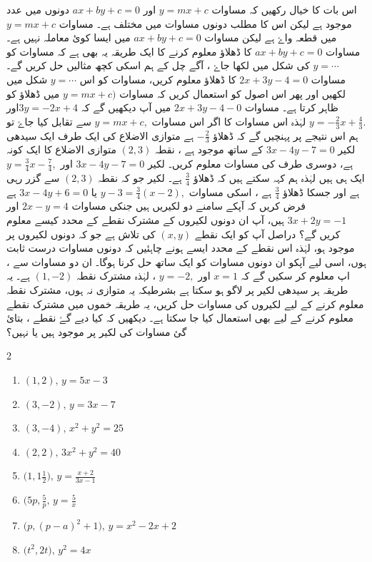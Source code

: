 اس بات کا خیال رکھیں کہ مساوات  \( y=mx+c \) اور \( ax+by+c=0 \) دونوں میں عدد   موجود ہے لیکن اس کا مطلب دونوں مساوات میں مختلف ہے۔ مساوات \( y=mx+c \) میں   قطعہ واۓ ہے لیکن مساوات \( ax+by+c=0 \) میں ایسا کوئ معاملہ نہیں ہے۔
مساوات \( ax+by+c=0 \) کا ڈھلاؤ معلوم کرنے کا ایک طریقہ یہ بھی ہے کہ مساوات کو  \( y= \cdots \) کی شکل میں لکھا جاۓ ، آگے چل کے ہم اسکی کچھ مثالیں حل کریں گے۔
مساوات \( 2x+3y-4=0 \) کا ڈھلاؤ معلوم کریں،
مساوات کو اس \( y= \cdots \) شکل میں لکھیں اور پھر اس اصول کو استعمال کریں کہ مساوات \( y=mx+c) \) میں  ڈھلاؤ کو ظاہر کرتا ہے۔ 
مساوات \(  2x+3y-4-0 \) میں آپ دیکھیں گے کہ \( 3y = -2x +4 \)اور\( y= - \frac{2}{3} x + \frac{4}{3}. \) لہٰذہ اس مساوات کا اگر  اس مساوات \( y=mx+c ,\) سے تقابل کیا جاۓ تو ہم اس نتیجے پر پہنچیں گے کہ ڈھلاؤ  \(- \frac{2}{3} \) ہے
متوازی الاضلاع کی ایک طرف ایک سیدھی لکیر \( 3x -4y -7 = 0 \) کے ساتھ موجود ہے ، نقطہ \( (2,3) \) متوازی الاضلاع کا ایک کونہ ہے، دوسری طرف کی مساوات معلوم کریں۔
لکیر \( 3x-4y-7=0 \) اور \( y= \frac{3}{4}x - \frac{7}{4} , \) ایک ہی ہیں لہٰذہ ہم کہہ سکتے ہیں کہ ڈھلاؤ \( \frac{3}{4}\) ہے۔ لکیر جو کہ نقطہ \( (2,3) \) سے گزر رہی ہے اور جسکا ڈھلاؤ \( \frac{3}{4}\) ہے ، اسکی مساوات \( y-3=\frac{3}{4} (x-2) , \) یا \( 3x-4y+6=0 \) ہے
فرض کریں کہ آپکے سامنے دو لکیریں ہیں جنکی مساوات \( 2x-y=4  \) اور \(  3x+2y=-1\) ہیں، آپ ان دونوں لکیروں کے مشترک نقطے کے محدد کیسے معلوم کریں گے؟
دراصل آپ کو ایک نقطے \(  (x,y)    \) کی تلاش ہے جو کہ دونوں لکیروں پر موجود ہو، لہٰذہ اس نقطے کے محدد ایسے ہونے چاہئیں کہ دونوں مساوات درست  ثابت ہوں، اسی لیے آپکو ان دونوں مساوات کو ایک ساتھ حل کرنا ہوگا۔
ان دو مساوات سے ، اپ معلوم کر سکیں گے کہ \( x=1\) اور \( y=-2, \) ، لہٰذہ مشترک نقطہ \( (1,-2) \) ہے۔ 
یہ طریقہ ہر سیدھی لکیر پر لاگو ہو سکتا ہے بشرطیکہ یہ متوازی نہ ہوں، مشترک نقطہ معلوم کرنے کے لیے لکیروں کی مساوات حل کریں، یہ طریقہ خموں میں مشترک نقطے معلوم کرنے کے لیے بھی استعمال کیا جا سکتا ہے۔ 
دیکھیں کہ کیا دیے گۓ نقطے ، بتائ گئ مساوات کی لکیر پر موجود ہیں یا نہیں؟
\begin{multicols}{2}
   \begin{enumerate}[.a]
\item \( (1,2),\,y=5x-3 \)
\item \( (3,-2),\,y=3x-7 \)
\item \( (3,-4),\,x^2 + y^2 = 25 \)
\item \( (2,2),\,3x^2 + y^2 = 40 \)
\item \( \big(1,1\frac{1}{2} \big),\,y=\frac{x+2}{3x-1} \)
\item \( \big( 5p, \frac{5}{p},\,y=\frac{5}{x} \)
\item \( \big(p,(p-a)^2 +1 \big),\,y=x^2 -2x +2 \)
\item \( \big( t^2, 2t \big),\,y^2 = 4x \)
\end{enumerate}
\end{multicols}
